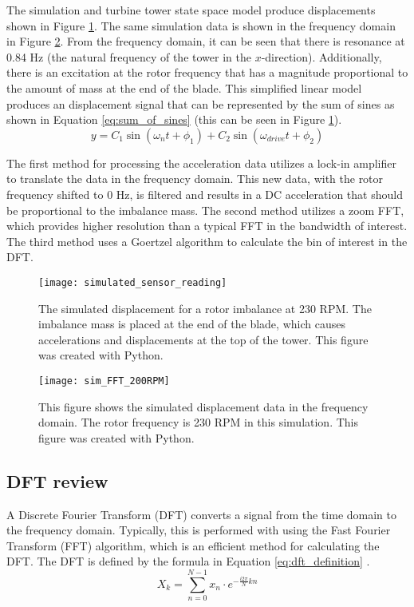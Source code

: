 The simulation and turbine tower state space model produce displacements shown in Figure \ref{fig:simulated_sensor_reading}.  The same simulation data is shown in the frequency domain  in Figure \ref{fig:sim_FFT_200RPM}.  From the frequency domain, it can be seen that there is resonance at 0.84 Hz (the natural frequency of the tower in the $x$-direction).  Additionally, there is an excitation at the rotor frequency that has a magnitude proportional to the amount of mass at the end of the blade.  This simplified linear model produces an displacement signal that can be represented by the sum of sines as shown in Equation \ref{eq:sum_of_sines} (this can be seen in Figure \ref{fig:simulated_sensor_reading}).
\begin{equation} \label{eq:sum_of_sines}
	y = C_1 \sin{(\omega_n t + \phi_1)} + C_2 \sin{(\omega_{drive} t + \phi_2)}
\end{equation}

The first method for processing the acceleration data utilizes a lock-in amplifier to translate the data in the frequency domain.  This new data, with the rotor frequency shifted to 0 Hz, is filtered and results in a DC acceleration that should be proportional to the imbalance mass.  The second method utilizes a zoom FFT, which provides higher resolution than a typical FFT in the bandwidth of interest.  The third method uses a Goertzel algorithm to calculate the bin of interest in the DFT.

\begin{figure}
	\centering
	\texttt{[image: simulated\_sensor\_reading]}
	\decoRule
	\caption{The simulated displacement for a rotor imbalance at 230 RPM.  The imbalance mass is placed at the end of the blade, which causes accelerations and displacements at the top of the tower.  This figure was created with Python.}
	\label{fig:simulated_sensor_reading}
\end{figure}

\begin{figure}
	\centering
	\texttt{[image: sim\_FFT\_200RPM]}
	\decoRule
	\caption{This figure shows the simulated displacement data in the frequency domain.  The rotor frequency is 230 RPM in this simulation. This figure was created with Python.}
	\label{fig:sim_FFT_200RPM}
\end{figure}

\subsection{DFT review}
A Discrete Fourier Transform (DFT) converts a signal from the time domain to the frequency domain.  Typically, this is performed with using the Fast Fourier Transform (FFT) algorithm, which is an efficient method for calculating the DFT.  The DFT is defined by the formula in Equation \ref{eq:dft_definition} \cite{winograd1976computing}.
\begin{equation} \label{eq:dft_definition}
	X_k = \sum_{n=0}^{N-1}{x_n \cdot e^{-\frac{i 2 \pi}{N} k n}}
\end{equation}

